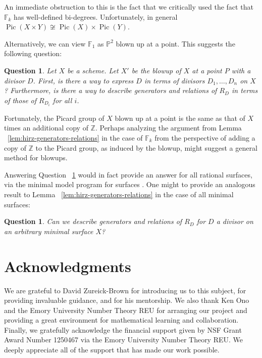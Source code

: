 \documentclass{amsart}
\theoremstyle{plain}
\newtheorem{question}[thm]{Question}
\theoremstyle{definition}
\theoremstyle{remark}
\numberwithin{equation}{section}
\newcommand\bp{{\mathbb P}}
\newcommand\bz{{\mathbb Z}}
\newcommand\hirz{\mathbb{F}}
\DeclareMathOperator{\Pic}{Pic}
\begin{document}
An immediate obstruction to this is the fact that we critically used the fact
that $\hirz_k$ has well-defined bi-degrees.  Unfortunately, in general $\Pic(X
\times Y) \not \cong \Pic(X) \times \Pic(Y)$.

Alternatively, we can view $\hirz_1$ as $\bp^2$ blown up at a point.  This
suggests the following question:
\begin{question}
\label{qn:general-blowup}
Let $X$ be a scheme.  Let $X'$ be the blowup of $X$ at a point $P$ with a
divisor $D$.  First, is there a way to express $D$ in terms of divisors $D_1,
\ldots, D_n$ on $X$?  Furthermore, is there a way to describe generators and
relations of $R_D$ in terms of those of $R_{D_i}$ for all $i$.
\end{question}

Fortunately, the Picard group of $X$ blown up at a point is the same as that of
$X$ times an additional copy of $\bz$.  Perhaps analyzing the argument from
Lemma ~\ref{lem:hirz-generators-relations}  in the case of $\hirz_k$ from the
perspective of adding a copy of $\mathbb{Z}$ to the Picard group, as induced by
the blowup, might suggest a general method for blowups.

Answering Question ~\ref{qn:general-blowup} would in fact provide an answer for
all rational surfaces, via the minimal model program for surfaces
.  One might to provide an analogous result to Lemma
~\ref{lem:hirz-generators-relations}  in the case of all minimal surfaces:
\begin{question}
\label{qn:general-minimal-surface}
Can we describe generators and relations of $R_D$ for $D$ a divisor on an
arbitrary minimal surface $X$?
\end{question}


\section{Acknowledgments}
\label{sec:ack}
We are grateful to David Zureick-Brown for introducing us to this
subject, for providing invaluable guidance,
and for his mentorship. We also thank Ken Ono and the
Emory University Number Theory REU for arranging our project and
providing a great environment for mathematical learning and
collaboration.
Finally, we gratefully acknowledge the financial support given by
NSF Grant Award Number 1250467 via the Emory University Number
Theory REU. We deeply appreciate all of the support that has made
our work possible.


\nocite{*}
{}

\end{document}
